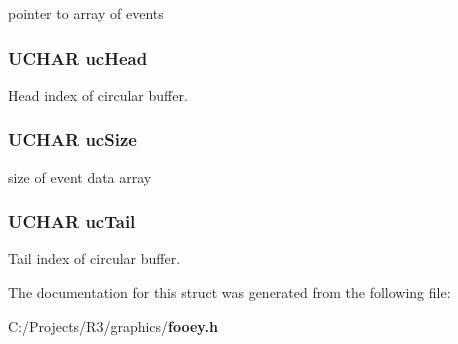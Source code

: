 pointer to array of events 
\subsubsection[{ucHead}]{\setlength{\rightskip}{0pt plus 5cm}UCHAR {\bf ucHead}}\label{struct_g_u_i___e_v_e_n_t___q_u_e_u_e___s_t_r_u_c_t_a4f91c0e37cafa6eaac87a3bc1b422dfc}


Head index of circular buffer. 
\subsubsection[{ucSize}]{\setlength{\rightskip}{0pt plus 5cm}UCHAR {\bf ucSize}}\label{struct_g_u_i___e_v_e_n_t___q_u_e_u_e___s_t_r_u_c_t_a337c0e603ae3d59d95c77626cabab943}


size of event data array 
\subsubsection[{ucTail}]{\setlength{\rightskip}{0pt plus 5cm}UCHAR {\bf ucTail}}\label{struct_g_u_i___e_v_e_n_t___q_u_e_u_e___s_t_r_u_c_t_a29134ca6534e7622ac06ccb07486ba07}


Tail index of circular buffer. 

The documentation for this struct was generated from the following file:\begin{DoxyCompactItemize}
\item 
C:/Projects/R3/graphics/{\bf fooey.h}\end{DoxyCompactItemize}
